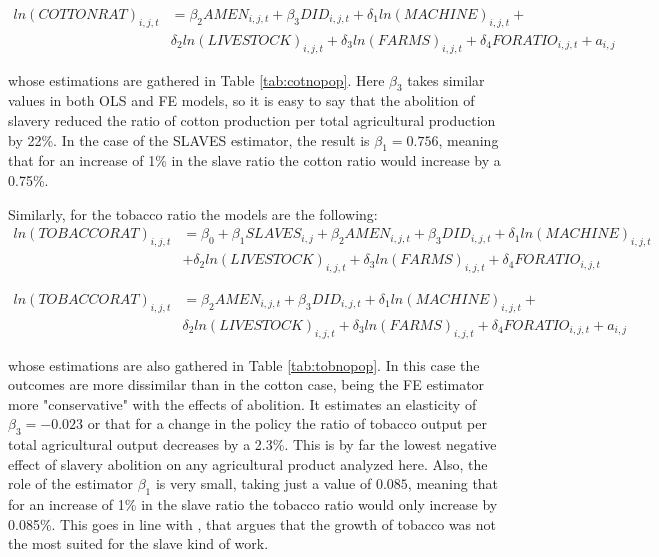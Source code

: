\documentclass[12pt]{report}
\begin{document}
\begin{equation}
\begin{split}
ln(COTTONRAT)_{i,j,t} &=\beta_{2}AMEN_{i,j,t}+\beta_{3}DID_{i,j,t}+\delta_{1}ln(MACHINE)_{i,j,t}+
\\
&\delta_{2}ln(LIVESTOCK)_{i,j,t}+\delta_{3}ln(FARMS)_{i,j,t}+\delta_{4}FORATIO_{i,j,t} + a_{i,j}
\end{split}
\end{equation}

whose estimations are gathered in Table \ref{tab:cotnopop}. Here $\beta_{3}$ takes similar values in both OLS and FE models, so it is easy to say that the abolition of slavery reduced the ratio of cotton production per total agricultural production by 22\%. In the case of the SLAVES estimator, the result is $\beta_{1}=0.756$, meaning that for an increase of 1\% in the slave ratio the cotton ratio would increase by a 0.75\%.

Similarly, for the tobacco ratio the models are the following:
\begin{equation}\begin{split}
ln(TOBACCORAT)_{i,j,t} &=\beta_{0}+\beta_{1}SLAVES_{i,j}+\beta_{2}AMEN_{i,j,t}+\beta_{3}DID_{i,j,t}+\delta_{1}ln(MACHINE)_{i,j,t}
\\
&+\delta_{2}ln(LIVESTOCK)_{i,j,t}+\delta_{3}ln(FARMS)_{i,j,t}+\delta_{4}FORATIO_{i,j,t}
\end{split}
\end{equation}

\begin{equation}
\begin{split}
ln(TOBACCORAT)_{i,j,t} &=\beta_{2}AMEN_{i,j,t}+\beta_{3}DID_{i,j,t}+\delta_{1}ln(MACHINE)_{i,j,t}+
\\
&\delta_{2}ln(LIVESTOCK)_{i,j,t}+\delta_{3}ln(FARMS)_{i,j,t}+\delta_{4}FORATIO_{i,j,t} + a_{i,j}
\end{split}
\end{equation}

whose estimations are also gathered in Table \ref{tab:tobnopop}. In this case the outcomes are more dissimilar than in the cotton case, being the FE estimator more "conservative" with the effects of abolition. It estimates an elasticity of $\beta_{3}=-0.023$ or that for a change in the policy the ratio of tobacco output per total agricultural output decreases by a 2.3\%. This is by far the lowest negative effect of slavery abolition on any agricultural product analyzed here. Also, the role of the estimator $\beta_{1}$ is very small, taking just a value of $0.085$, meaning that for an increase of 1\% in the slave ratio the tobacco ratio would only increase by 0.085\%. This goes in line with \citet[29]{wright2013slavery}, that argues that the growth of tobacco was not the most suited for the slave kind of work.
\end{document}
